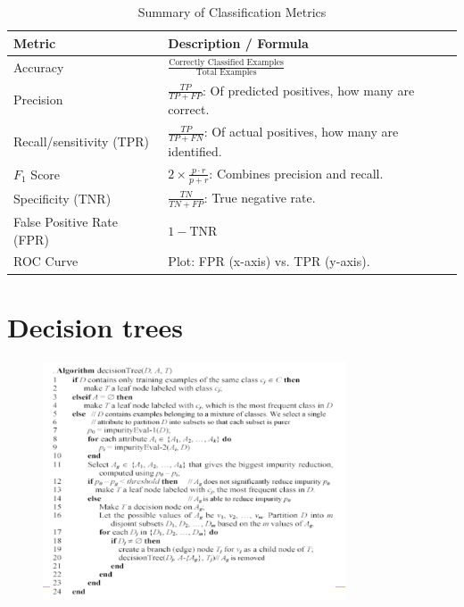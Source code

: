 \documentclass[10pt,oneside,a4paper]{article}
\begin{document}
\begin{table}[H]
    \centering
    \begin{tabular}{|l|l|}
        \hline
        \textbf{Metric}           & \textbf{Description / Formula}                                       \\ \hline
        Accuracy                  & $\frac{\text{Correctly Classified Examples}}{\text{Total Examples}}$ \\ \hline
        Precision                 & $\frac{TP}{TP + FP}$: Of predicted positives, how many are correct.  \\ \hline
        Recall/sensitivity (TPR)  & $\frac{TP}{TP + FN}$: Of actual positives, how many are identified.  \\ \hline
        $F_1$ Score               & $2 \times \frac{p \cdot r}{p + r}$: Combines precision and recall.   \\ \hline
        Specificity (TNR)         & $\frac{TN}{TN + FP}$: True negative rate.                            \\ \hline
        False Positive Rate (FPR) & $1 - \text{TNR}$                                                     \\ \hline
        ROC Curve                 & Plot: FPR (x-axis) vs. TPR (y-axis).                                 \\ \hline
    \end{tabular}
    \caption{Summary of Classification Metrics}
\end{table}


\section{Decision trees}
\begin{figure}[H]
    \centering
    \includegraphics[width=0.8\textwidth]{Images/DecisionTree.png}
\end{figure}
\end{document}
